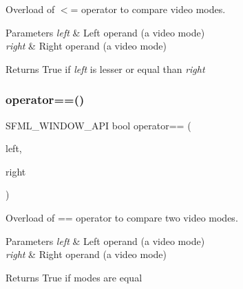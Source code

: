 Overload of $<$= operator to compare video modes. 


\begin{DoxyParams}{Parameters}
{\em left} & Left operand (a video mode) \\
\hline
{\em right} & Right operand (a video mode)\\
\hline
\end{DoxyParams}
\begin{DoxyReturn}{Returns}
True if {\itshape left} is lesser or equal than {\itshape right} \begin{DoxyVerb}\end{DoxyVerb}
 
\end{DoxyReturn}
\mbox{\label{classsf_1_1_video_mode_a03c51c119811ffd4403c6e2bcbd4ceaf}} 
\subsubsection{\texorpdfstring{operator==()}{operator==()}}
{\footnotesize\ttfamily S\+F\+M\+L\+\_\+\+W\+I\+N\+D\+O\+W\+\_\+\+A\+PI bool operator== (\begin{DoxyParamCaption}\item[{const \mbox{\hyperlink{classsf_1_1_video_mode}{Video\+Mode}} \&}]{left,  }\item[{const \mbox{\hyperlink{classsf_1_1_video_mode}{Video\+Mode}} \&}]{right }\end{DoxyParamCaption})\hspace{0.3cm}{\ttfamily [related]}}



Overload of == operator to compare two video modes. 


\begin{DoxyParams}{Parameters}
{\em left} & Left operand (a video mode) \\
\hline
{\em right} & Right operand (a video mode)\\
\hline
\end{DoxyParams}
\begin{DoxyReturn}{Returns}
True if modes are equal \begin{DoxyVerb}\end{DoxyVerb}
 
\end{DoxyReturn}
\mbox{\label{classsf_1_1_video_mode_ab6e5b2c65a428a4b56de8551b3706a36}} 
